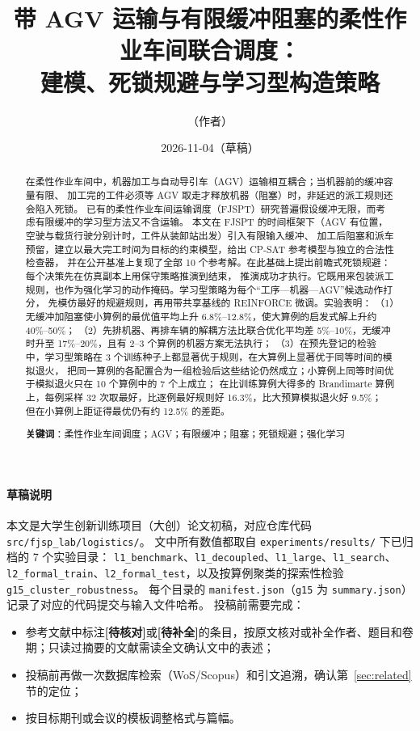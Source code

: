 \documentclass[11pt,a4paper]{ctexart}
\title{带 AGV 运输与有限缓冲阻塞的柔性作业车间联合调度：\\建模、死锁规避与学习型构造策略}
\author{（作者）}
\date{2026-11-04（草稿）}
\theoremstyle{definition}
\theoremstyle{remark}
\begin{document}
\maketitle

\paragraph{草稿说明}
{\sloppy
本文是大学生创新训练项目（大创）论文初稿，对应仓库代码 \texttt{src/fjsp\_lab/logistics/}。
文中所有数值都取自 \texttt{experiments/results/} 下已归档的 7 个实验目录：
\texttt{l1\_benchmark}、\texttt{l1\_decoupled}、\texttt{l1\_large}、\texttt{l1\_search}、
\texttt{l2\_formal\_train}、\texttt{l2\_formal\_test}，以及按算例聚类的探索性检验 \texttt{g15\_cluster\_robustness}。
每个目录的 \texttt{manifest.json}（\texttt{g15} 为 \texttt{summary.json}）记录了对应的代码提交与输入文件哈希。
投稿前需要完成：\par}
\begin{itemize}[nosep]
  \item 参考文献中标注\textbf{[待核对]}或\textbf{[待补全]}的条目，按原文核对或补全作者、题目和卷期；只读过摘要的文献需读全文确认文中的表述；
  \item 投稿前再做一次数据库检索（WoS/Scopus）和引文追溯，确认第~\ref{sec:related} 节的定位；
  \item 按目标期刊或会议的模板调整格式与篇幅。
\end{itemize}

\begin{abstract}
在柔性作业车间中，机器加工与自动导引车（AGV）运输相互耦合；当机器前的缓冲容量有限、
加工完的工件必须等 AGV 取走才释放机器（阻塞）时，非延迟的派工规则还会陷入死锁。
已有的柔性作业车间运输调度（FJSPT）研究普遍假设缓冲无限，而考虑有限缓冲的学习型方法又不含运输。
本文在 FJSPT 的时间框架下（AGV 有位置，空驶与载货行驶分别计时，工件从装卸站出发）引入有限输入缓冲、
加工后阻塞和派车预留，建立以最大完工时间为目标的约束模型，给出 CP-SAT 参考模型与独立的合法性检查器，
并在公开基准上复现了全部 10 个参考解。在此基础上提出前瞻式死锁规避：每个决策先在仿真副本上用保守策略推演到结束，
推演成功才执行。它既用来包装派工规则，也作为强化学习的动作掩码。学习型策略为每个“工序—机器—AGV”候选动作打分，
先模仿最好的规避规则，再用带共享基线的 REINFORCE 微调。实验表明：
（1）无缓冲加阻塞使小算例的最优值平均上升 6.8\%--12.8\%，使大算例的启发式解上升约 40\%--50\%；
（2）先排机器、再排车辆的解耦方法比联合优化平均差 5\%--10\%，无缓冲时升至 17\%--20\%，且有 2--3 个算例的机器方案无法执行；
（3）在预先登记的检验中，学习型策略在 3 个训练种子上都显著优于规则，在大算例上显著优于同等时间的模拟退火，
把同一算例的各配置合为一组检验后这些结论仍然成立；小算例上同等时间优于模拟退火只在 10 个算例中的 7 个上成立；
在比训练算例大得多的 Brandimarte 算例上，每例采样 32 次取最好，比逐例最好规则好 16.3\%，比大预算模拟退火好 9.5\%；
但在小算例上距证得最优仍有约 12.5\% 的差距。

\noindent\textbf{关键词}：柔性作业车间调度；AGV；有限缓冲；阻塞；死锁规避；强化学习
\end{abstract}
\end{document}
